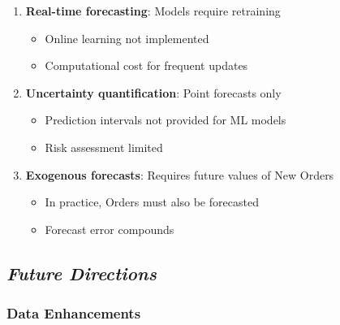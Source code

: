\documentclass[12pt]{article}
\begin{document}
\begin{enumerate}
    \item \textbf{Real-time forecasting}: Models require retraining
    \begin{itemize}
        \item Online learning not implemented
        \item Computational cost for frequent updates
    \end{itemize}

    \item \textbf{Uncertainty quantification}: Point forecasts only
    \begin{itemize}
        \item Prediction intervals not provided for ML models
        \item Risk assessment limited
    \end{itemize}

    \item \textbf{Exogenous forecasts}: Requires future values of New Orders
    \begin{itemize}
        \item In practice, Orders must also be forecasted
        \item Forecast error compounds
    \end{itemize}
\end{enumerate}

\subsection*{\textit{Future Directions}}

\subsubsection*{Data Enhancements}
\end{document}
